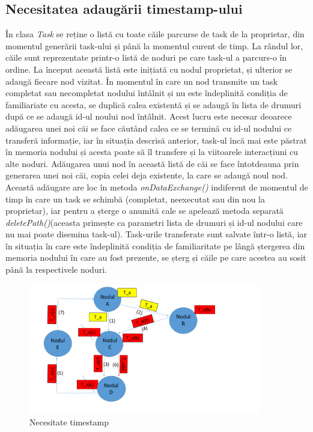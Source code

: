 \documentclass[12pt,a4paper]{report}
\begin{document}
\subsection{Necesitatea adaugării timestamp-ului}
În clasa \textit{Task} se reține o listă cu toate căile parcurse de task de la proprietar, din momentul generării task-ului și până la momentul curent de timp. La rândul lor, căile sunt reprezentate printr-o listă de noduri pe care task-ul a parcurs-o în ordine. La început această listă este inițiată cu nodul proprietat, și ulterior se adaugă fiecare nod vizitat. În momentul în care un nod transmite un task completat sau necompletat nodului întâlnit și nu este îndeplinită condiția de familiariate cu acesta, se duplică calea existentă și se adaugă în lista de drumuri după ce se adaugă id-ul noului nod întâlnit. Acest lucru este necesar deoarece adăugarea unei noi căi se face căutând calea ce se termină cu id-ul nodului ce transferă informație, iar în situația descrisă anterior, task-ul încă mai este păstrat în memoria nodului și acesta poate să îl transfere și la viitoarele interacțiuni cu alte noduri. Adăugarea unui nod în această listă de căi se face întotdeauna prin generarea unei noi căi, copia celei deja existente, la care se adaugă noul nod. Această adăugare are loc în metoda \textit{onDataExchange()} indiferent de momentul de timp în care un task se schimbă (completat, neexecutat sau din nou la proprietar), iar pentru a șterge o anumită cale se apelează metoda separată \textit{deletePath()}(aceasta primește ca parametri lista de drumuri și id-ul nodului care nu mai poate disemina task-ul). Task-urile transferate sunt salvate într-o listă, iar în situația în care este îndeplinită condiția de familiaritate pe lângă ștergerea din memoria nodului în care au fost prezente, se șterg și căile pe care acestea au sosit până la respectivele noduri.

\begin{figure}[th]
\centering
\includegraphics[width=4in]{pics/Timestamp.pdf}
  \caption[ca]{Necesitate timestamp}
  \label{fig:timestamp}
\end{figure}
\end{document}
